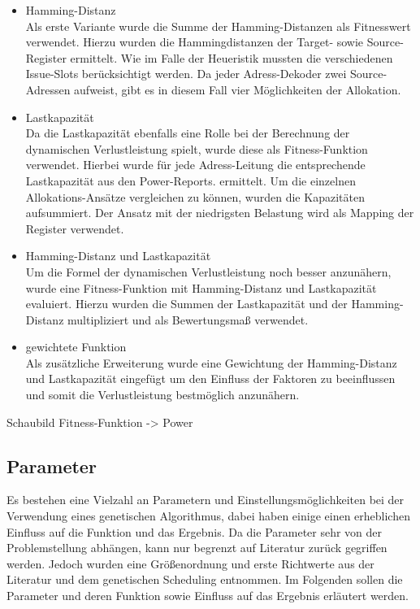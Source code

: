 \begin{itemize}
	\item Hamming-Distanz\\
		Als erste Variante wurde die Summe der Hamming-Distanzen als Fitnesswert verwendet. Hierzu wurden die Hammingdistanzen der Target- sowie Source-Register ermittelt. Wie im Falle der Heueristik mussten die verschiedenen Issue-Slots berücksichtigt werden. Da jeder Adress-Dekoder zwei Source-Adressen aufweist, gibt es in diesem Fall vier Möglichkeiten der Allokation.
	\item Lastkapazität\\
		Da die Lastkapazität ebenfalls eine Rolle bei der Berechnung der dynamischen Verlustleistung spielt, wurde diese als Fitness-Funktion verwendet. Hierbei wurde für jede Adress-Leitung die entsprechende Lastkapazität aus den Power-Reports. ermittelt. Um die einzelnen Allokations-Ansätze vergleichen zu können, wurden die Kapazitäten aufsummiert. Der Ansatz mit der niedrigsten Belastung wird als Mapping  der Register verwendet. 
	\item Hamming-Distanz und Lastkapazität\\
		Um die Formel der dynamischen Verlustleistung noch besser anzunähern, wurde eine Fitness-Funktion mit Hamming-Distanz und Lastkapazität evaluiert. Hierzu wurden die Summen der Lastkapazität und der Hamming-Distanz multipliziert und als Bewertungsmaß verwendet.
	\item gewichtete Funktion\\
		Als zusätzliche Erweiterung wurde eine Gewichtung der Hamming-Distanz und Lastkapazität eingefügt um den Einfluss der Faktoren zu beeinflussen und somit die Verlustleistung bestmöglich anzunähern.
\end{itemize}

Schaubild Fitness-Funktion -> Power
 
\subsection{Parameter}
\label{cap:parameter}
Es bestehen eine Vielzahl an Parametern und Einstellungsmöglichkeiten bei der Verwendung eines genetischen Algorithmus, dabei haben einige einen erheblichen Einfluss auf die Funktion und das Ergebnis. Da die Parameter sehr von der Problemstellung abhängen, kann nur begrenzt auf Literatur zurück gegriffen werden. Jedoch wurden eine Größenordnung und erste Richtwerte aus der Literatur \cite{grefenstette1986optimization} und dem genetischen Scheduling entnommen. Im Folgenden sollen die Parameter und deren Funktion sowie Einfluss auf das Ergebnis erläutert werden.

